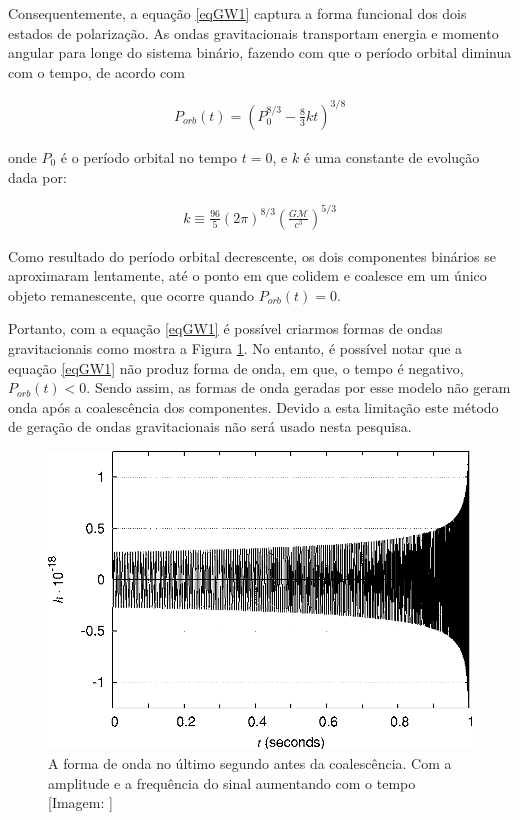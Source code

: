 Consequentemente, a equação \ref{eqGW1} captura a forma funcional dos dois estados de polarização. As ondas gravitacionais transportam energia e momento angular para longe do sistema binário, fazendo com que o período orbital diminua com o tempo, de acordo com

\begin{equation} \label{eqGW4}
\begin{split}
P_{orb}(t) = \left(P_0^{8/3} - \frac{8}{3}kt \right)^{3/8}
\end{split}
\end{equation}

onde $P_0$ é o período orbital no tempo $t = 0$, e $k$ é uma constante de evolução dada por:

\begin{equation} \label{eqGW5}
\begin{split}
k \equiv \frac{96}{5}(2\pi)^{8/3} \left(\frac{G\mathcal{M}}{c^3}\right)^{5/3}
\end{split}
\end{equation}

Como resultado do período orbital decrescente, os dois componentes binários se aproximaram lentamente, até o ponto em que colidem e coalesce em um único objeto remanescente, que ocorre quando $P_{orb}(t) = 0$.

Portanto, com a equação \ref{eqGW1} é possível criarmos formas de ondas gravitacionais como mostra a Figura \ref{figmetade}. No entanto, é possível notar que a equação \ref{eqGW1} não produz forma de onda, em que, o tempo é negativo, $P_{orb}(t) < 0$. Sendo assim, as formas de onda geradas por esse modelo não geram onda após a coalescência dos componentes. Devido a esta limitação este método de geração de ondas gravitacionais não será usado nesta pesquisa.

\begin{figure}[ht]
\centering
\includegraphics[width=.9\textwidth]{figuras/metade.png}
\caption{A forma de onda no último segundo antes da coalescência. Com a amplitude e a frequência do sinal aumentando com o tempo [Imagem: \cite{rubbo2007hands}]}
\label{figmetade}
\end{figure}

